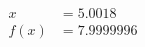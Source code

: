 \documentclass[preview]{standalone}
\begin{document}
\begin{align*}
x &= 5.0018\\f(x) &= 7.9999996
\end{align*}
\end{document}
